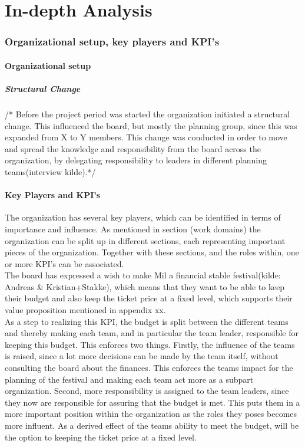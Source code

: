 \part{In-depth Analysis}

\section{Organizational setup, key players and KPI's}
\subsection{Organizational setup}
\subsubsection{Structural Change}
/*
Before the project period was started the organization initiated a structural change. This influenced the board, but mostly the planning group, since this was expanded from X to Y members. This change was conducted in order to move and spread the knowledge and responsibility from the board across the organization, by delegating responsibility to leaders in different planning teams(interview kilde).*/

\subsection{Key Players and KPI's}
The organization has several key players, which can be identified in terms of importance and influence. As mentioned in section (work domains) the organization can be split up in different sections, each representing important pieces of the organization. Together with these sections, and the roles within, one or more KPI's can be associated.\\
The board has expressed a wish to make Mil a financial stable festival(kilde: Andreas & Kristian+Stakke), which means that they want to be able to keep their budget and also keep the ticket price at a fixed level, which supports their value proposition mentioned in appendix xx.\\ 
As a step to realizing this KPI, the budget is split between the different teams
and thereby making each team, and in particular the team leader, responsible for
keeping this budget. This enforces two things. Firstly, the influence of the
teams is raised, since a lot more decisions can be made by the team itself,
without consulting the board about the finances. This enforces the teams impact
for the planning of the festival and making each team act more as a subpart
organization. Second, more responsibility is assigned to the team leaders, since
they now are responsible for assuring that the budget is met. This puts them in a more important position within the organization as the roles they poses becomes more influent. 
As a derived effect of the teams ability to meet the budget, will be the option to keeping the ticket price at a fixed level. 


